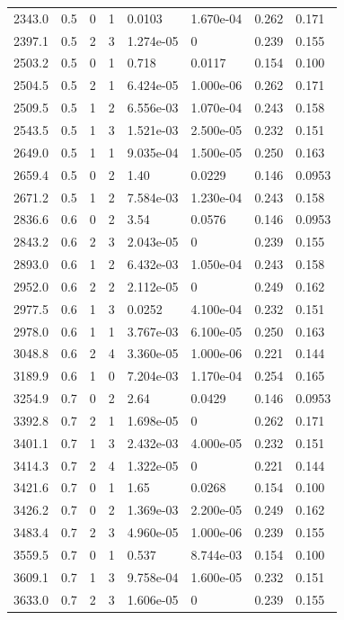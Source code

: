 \documentclass[preview]{standalone}
\begin{document}
{{{\begin{tabular}{L{1.2cm}C{1.2cm} C{0.3cm}C{0.5cm} C{1.4cm}C{1.4cm} C{1.4cm}C{1.4cm}}
  2343.0  &   0.5  & 0     &  1 &  0.0103  & 1.670e-04  & 0.262 &  0.171   \\ 
  2397.1  &   0.5  & 2     &  3 &  1.274e-05  & 0  & 0.239 &  0.155   \\ 
  2503.2  &   0.5  & 0     &  1 &  0.718  & 0.0117  & 0.154 &  0.100   \\ 
  2504.5  &   0.5  & 2     &  1 &  6.424e-05  & 1.000e-06  & 0.262 &  0.171   \\ 
  2509.5  &   0.5  & 1     &  2 &  6.556e-03  & 1.070e-04  & 0.243 &  0.158   \\ 
  2543.5  &   0.5  & 1     &  3 &  1.521e-03  & 2.500e-05  & 0.232 &  0.151   \\ 
  2649.0  &   0.5  & 1     &  1 &  9.035e-04  & 1.500e-05  & 0.250 &  0.163   \\ 
  2659.4  &   0.5  & 0     &  2 &  1.40  & 0.0229  & 0.146 &  0.0953   \\ 
  2671.2  &   0.5  & 1     &  2 &  7.584e-03  & 1.230e-04  & 0.243 &  0.158   \\ 
  2836.6  &   0.6  & 0     &  2 &  3.54  & 0.0576  & 0.146 &  0.0953   \\ 
  2843.2  &   0.6  & 2     &  3 &  2.043e-05  & 0  & 0.239 &  0.155   \\ 
  2893.0  &   0.6  & 1     &  2 &  6.432e-03  & 1.050e-04  & 0.243 &  0.158   \\ 
  2952.0  &   0.6  & 2     &  2 &  2.112e-05  & 0  & 0.249 &  0.162   \\ 
  2977.5  &   0.6  & 1     &  3 &  0.0252  & 4.100e-04  & 0.232 &  0.151   \\ 
  2978.0  &   0.6  & 1     &  1 &  3.767e-03  & 6.100e-05  & 0.250 &  0.163   \\ 
  3048.8  &   0.6  & 2     &  4 &  3.360e-05  & 1.000e-06  & 0.221 &  0.144   \\ 
  3189.9  &   0.6  & 1     &  0 &  7.204e-03  & 1.170e-04  & 0.254 &  0.165   \\ 
  3254.9  &   0.7  & 0     &  2 &  2.64  & 0.0429  & 0.146 &  0.0953   \\ 
  3392.8  &   0.7  & 2     &  1 &  1.698e-05  & 0  & 0.262 &  0.171   \\ 
  3401.1  &   0.7  & 1     &  3 &  2.432e-03  & 4.000e-05  & 0.232 &  0.151   \\ 
  3414.3  &   0.7  & 2     &  4 &  1.322e-05  & 0  & 0.221 &  0.144   \\ 
  3421.6  &   0.7  & 0     &  1 &  1.65  & 0.0268  & 0.154 &  0.100   \\ 
  3426.2  &   0.7  & 0     &  2 &  1.369e-03  & 2.200e-05  & 0.249 &  0.162   \\ 
  3483.4  &   0.7  & 2     &  3 &  4.960e-05  & 1.000e-06  & 0.239 &  0.155   \\ 
  3559.5  &   0.7  & 0     &  1 &  0.537  & 8.744e-03  & 0.154 &  0.100   \\ 
  3609.1  &   0.7  & 1     &  3 &  9.758e-04  & 1.600e-05  & 0.232 &  0.151   \\ 
  3633.0  &   0.7  & 2     &  3 &  1.606e-05  & 0  & 0.239 &  0.155   \\ 
\hline 
\end{tabular} 

}}}
\end{document}
